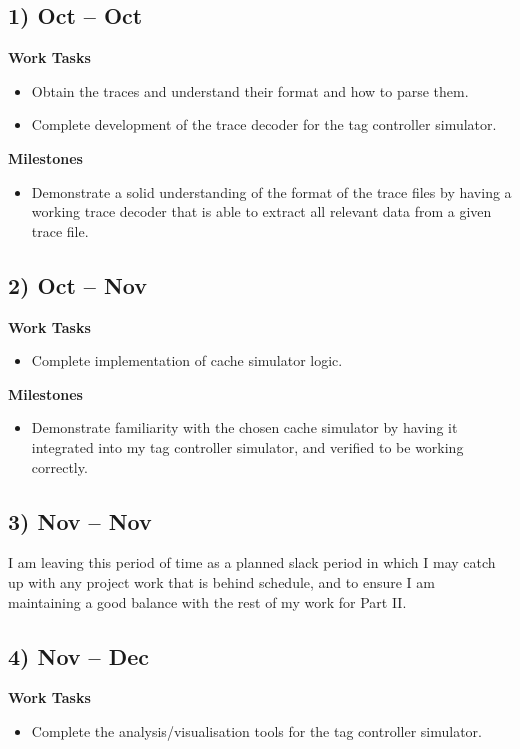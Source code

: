 \documentclass[10pt,a4paper]{article}
\begin{document}
\subsection*{1)  Oct --  Oct}
\textbf{Work Tasks}
\begin{itemize}
	\item Obtain the traces and understand their format and how to parse them.
	\item Complete development of the trace decoder for the tag controller simulator.
\end{itemize}

\textbf{Milestones}
\begin{itemize}
	\item Demonstrate a solid understanding of the format of the trace files by having a working trace decoder that is able to extract all relevant data from a given trace file.
\end{itemize}

\subsection*{2)  Oct --  Nov}
\textbf{Work Tasks}
\begin{itemize}
	\item Complete implementation of cache simulator logic.
\end{itemize}

\textbf{Milestones}
\begin{itemize}
	\item Demonstrate familiarity with the chosen cache simulator by having it integrated into my tag controller simulator, and verified to be working correctly.
\end{itemize}

\subsection*{3)  Nov --  Nov}
I am leaving this period of time as a planned slack period in which I may catch up with any project work that is behind schedule, and to ensure I am maintaining a good balance with the rest of my work for Part II.

\subsection*{4)  Nov --  Dec}
\textbf{Work Tasks}
\begin{itemize}
	\item Complete the analysis/visualisation tools for the tag controller simulator.
\end{itemize}
\end{document}
